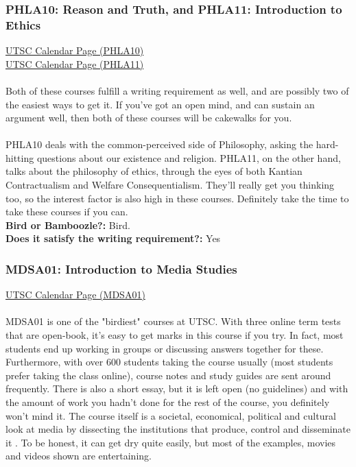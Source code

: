 \documentclass[11pt]{article}
\begin{document}
\subsubsection{PHLA10: Reason and Truth, and PHLA11: Introduction to Ethics}
\href{https://utsc.calendar.utoronto.ca/course/PHLA10H3}{UTSC Calendar Page (PHLA10)}\\
\href{https://utsc.calendar.utoronto.ca/course/PHLA11H3}{UTSC Calendar Page (PHLA11)}\\\\
Both of these courses fulfill a writing requirement as well, and are possibly two of the easiest ways to get it.  If you've got an open mind, and can sustain an argument well, then both of these courses will be cakewalks for you.\\\\ 
PHLA10 deals with the common-perceived side of Philosophy, asking the hard-hitting questions about our existence and religion.  PHLA11, on the other hand, talks about the philosophy of ethics, through the eyes of both Kantian Contractualism and Welfare Consequentialism.  They'll really get you thinking too, so the interest factor is also high in these courses.  Definitely take the time to take these courses if you can.\\

\textbf{Bird or Bamboozle?:} Bird.\\

\textbf{Does it satisfy the writing requirement?:} Yes

\subsubsection{MDSA01: Introduction to Media Studies}
\href{https://utsc.calendar.utoronto.ca/course/MDSA01H3}{UTSC Calendar Page (MDSA01)}\\\\
MDSA01 is one of the "birdiest" courses at UTSC. With three online term tests that are open-book, it's easy to get marks in this course if you try. In fact, most students end up working in groups or discussing answers together for these. Furthermore, with over 600 students taking the course usually (most students prefer taking the class online), course notes and study guides are sent around frequently. There is also a short essay, but it is left open (no guidelines) and with the amount of work you hadn't done for the rest of the course, you definitely won't mind it. The course itself is a societal, economical, political and cultural look at media by dissecting the institutions that produce, control and disseminate it	. To be honest, it can get dry quite easily, but most of the examples, movies and videos shown are entertaining.\\
\end{document}
